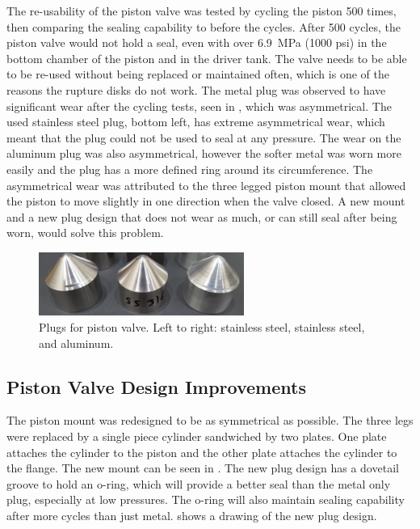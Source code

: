 The re-usability of the piston valve was tested by cycling the piston 500 times, then comparing the sealing capability to before the cycles. After 500 cycles, the piston valve would not hold a seal, even with over \SI{6.9}{\mega\pascal} (1000 psi) in the bottom chamber of the piston and in the driver tank. The valve needs to be able to be re-used without being replaced or maintained often, which is one of the reasons the rupture disks do not work. The metal plug was observed to have significant wear after the cycling tests, seen in , which was asymmetrical. The used stainless steel plug, bottom left, has extreme asymmetrical wear, which meant that the plug could not be used to seal at any pressure. The wear on the aluminum plug was also asymmetrical, however the softer metal was worn more easily and the plug has a more defined ring around its circumference. The asymmetrical wear was attributed to the three legged piston mount that allowed the piston to move slightly in one direction when the valve closed. A new mount and a new plug design that does not wear as much, or can still seal after being worn, would solve this problem.

\begin{figure}[tb]
    \vspace{16pt}
    \centering
    \includegraphics[width=0.6\textwidth]{design/photos/plug_gen1_wear_crop.png}
    \caption{Plugs for piston valve. Left to right: stainless steel, stainless steel, and aluminum.}
    \label{fig:plug wear}
    \vspace{16pt}
\end{figure}

\subsection{Piston Valve Design Improvements} \label{ss:new valve}
The piston mount was redesigned to be as symmetrical as possible. The three legs were replaced by a single piece cylinder sandwiched by two plates. One plate attaches the cylinder to the piston and the other plate attaches the cylinder to the flange. The new mount can be seen in . The new plug design has a dovetail groove to hold an o-ring, which will provide a better seal than the metal only plug, especially at low pressures. The o-ring will also maintain sealing capability after more cycles than just metal.  shows a drawing of the new plug design.

